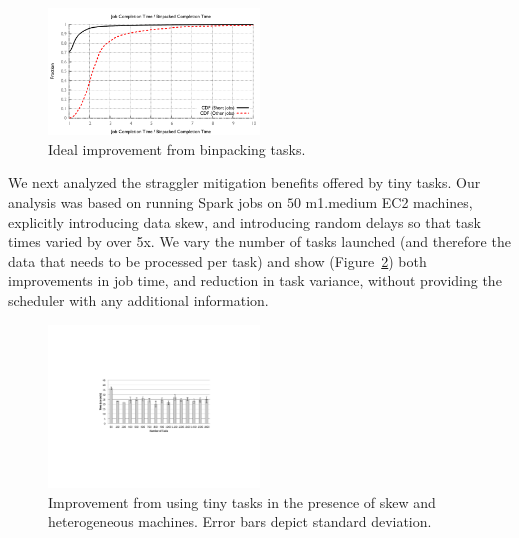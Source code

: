 \begin{figure}[t]
\centering
\hspace{2ex}
\includegraphics[width=0.5\textwidth]{figures/binpacked1-sep}
\vspace{-4ex}
\caption{Ideal improvement from binpacking tasks.}
\vspace{-2ex}
\label{fig:binpacked}
\end{figure}


We next analyzed the straggler mitigation benefits offered by tiny tasks. Our analysis was based on running
Spark jobs on $50$ m1.medium EC2 machines, explicitly introducing data skew, and introducing random delays
so that task times varied by over 5x. We vary the number of tasks launched (and therefore the data that
needs to be processed per task) and show (Figure~\ref{fig:sparkskew}) both improvements in job time,
and reduction in task variance, without providing the scheduler with any additional information.

\begin{figure}[t]
\centering
\hspace{2ex}
\includegraphics[width=0.5\textwidth]{figures/spark-skew-results}
\vspace{-4ex}
\caption{Improvement from using tiny tasks in the presence of skew and heterogeneous machines. Error bars depict standard deviation.}
\vspace{-2ex}
\label{fig:sparkskew}
\end{figure}




